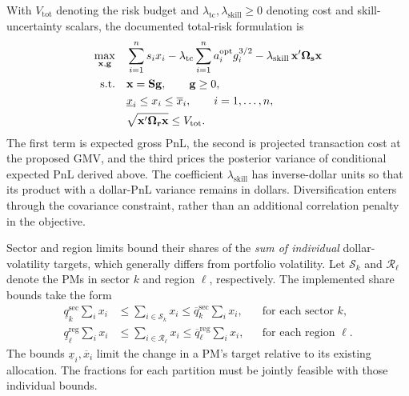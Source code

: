\documentclass[11pt]{gappyarticle}
\begin{document}
With $V_{\mathrm{tot}}$ denoting the risk budget and
$\lambda_{\mathrm{tc}},\lambda_{\mathrm{skill}}\geq0$ denoting cost and
skill-uncertainty scalars, the documented total-risk formulation is
\begin{align}
    \max_{{\mathbf{x}},\mathbf g}\quad&
        \sum_{i=1}^n s_i x_i
        -\lambda_{\mathrm{tc}}
             \sum_{i=1}^n a_i^{\mathrm{opt}} g_i^{3/2}
        -\lambda_{\mathrm{skill}}\,
             {\mathbf{x}}'{\boldsymbol{\Omega}}_{\mathbf{s}}{\mathbf{x}}
        \label{eq:capalloc_documented}\\
    \operatorname{{s.}{t.}}\quad&
        {\mathbf{x}}={\mathbf{S}}\mathbf g,\qquad \mathbf g\geq0, \label{eq:capalloc_scale}\\
    &\underline{x}_i\leq x_i\leq\overline{x}_i,
        \qquad i=1,\ldots,n, \label{eq:capalloc_box}\\
    &\sqrt{{\mathbf{x}}'{\boldsymbol{\Omega}}_{\mathbf{r}}{\mathbf{x}}}
        \leq V_{\mathrm{tot}}. \label{eq:capalloc_total_risk}
\end{align}
The first term is expected gross PnL, the second is projected transaction
cost at the proposed GMV, and the third prices the posterior variance of
conditional expected PnL derived above. The coefficient
$\lambda_{\mathrm{skill}}$ has inverse-dollar units so that its product
with a dollar-PnL variance remains in dollars.
Diversification enters through the covariance constraint, rather than an
additional correlation penalty in the objective.

Sector and region limits bound their shares of the \emph{sum of individual}
dollar-volatility targets, which generally differs from portfolio volatility.
Let $\mathcal{S}_k$ and $\mathcal{R}_\ell$ denote the PMs in sector $k$ and
region $\ell$, respectively. The implemented share bounds take the form
\begin{align}
    \underline q_k^{\mathrm{sec}}\sum_i x_i
       &\leq \sum_{i\in\mathcal{S}_k}x_i
        \leq\overline q_k^{\mathrm{sec}}\sum_i x_i,
        &&\text{for each sector }k,\\
    \underline q_\ell^{\mathrm{reg}}\sum_i x_i
       &\leq \sum_{i\in\mathcal{R}_\ell}x_i
        \leq\overline q_\ell^{\mathrm{reg}}\sum_i x_i,
        &&\text{for each region }\ell.
\end{align}
The bounds $\underline{x}_i,\overline{x}_i$ limit the change in a PM's
target relative to its existing allocation. The fractions for each
partition must be jointly feasible with those individual bounds.
\end{document}
